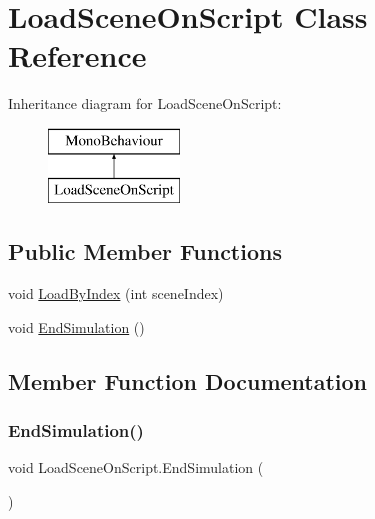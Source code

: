 \hypertarget{class_load_scene_on_script}{}\section{Load\+Scene\+On\+Script Class Reference}
\label{class_load_scene_on_script}
Inheritance diagram for Load\+Scene\+On\+Script\+:\begin{figure}[H]
\begin{center}
\leavevmode
\includegraphics[height=2.000000cm]{class_load_scene_on_script}
\end{center}
\end{figure}
\subsection*{Public Member Functions}
\begin{DoxyCompactItemize}
\item 
void \hyperlink{class_load_scene_on_script_a30b6b34844e13a2e1faf70ac09eb9707}{Load\+By\+Index} (int scene\+Index)
\item 
void \hyperlink{class_load_scene_on_script_ae3680d4695af71da600fc8d673565ffb}{End\+Simulation} ()
\end{DoxyCompactItemize}


\subsection{Member Function Documentation}
\mbox{\label{class_load_scene_on_script_ae3680d4695af71da600fc8d673565ffb}} 
\subsubsection{\texorpdfstring{End\+Simulation()}{EndSimulation()}}
{\footnotesize\ttfamily void Load\+Scene\+On\+Script.\+End\+Simulation (\begin{DoxyParamCaption}{ }\end{DoxyParamCaption})}

